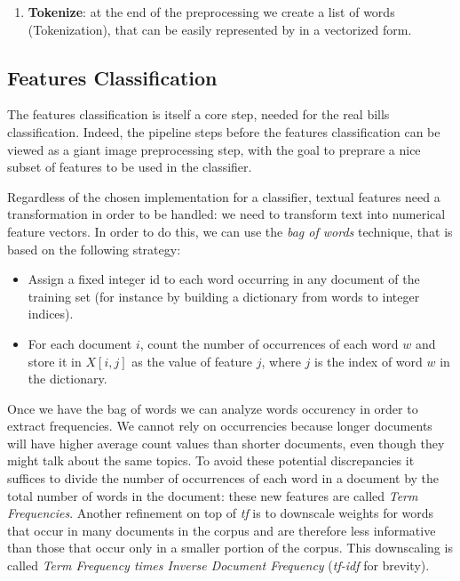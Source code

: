 \documentclass[10pt,twocolumn,letterpaper]{article}
\begin{document}
\begin{enumerate}
    the process of grouping together the inflected forms of a word so
    they can be analysed as a single item, identified by the word's
    lemma, or dictionary form.\footnote{\href{
        https://en.wikipedia.org/wiki/Lemmatisation}{
        https://en.wikipedia.org/wiki/Lemmatisation}}. With
    this step, indeed, we tried to group words together in order to
    simplify the classification phase. However, we noticed that this
    step do not improve the performance and it can also produce worst
    results as it tries to group wrong words retrieved from the OCR.
  \item \textbf{Tokenize}: at the end of the preprocessing we create a list of
    words (Tokenization), that can be easily represented by in a
    vectorized form.
\end{enumerate}

\subsection{Features Classification}
\label{subsec:classification}

The features classification is itself a core step, needed for the real
bills classification. Indeed, the pipeline steps before the features
classification can be viewed as a giant image preprocessing step, with
the goal to preprare a nice subset of features to be used in the
classifier.

Regardless of the chosen implementation for a classifier, textual
features need a transformation in order to be handled: we need to
transform text into numerical feature vectors. In order to do this, we
can use the \emph{bag of words} technique, that is based on the
following strategy:

\begin{itemize}
  \item Assign a fixed integer id to each word occurring in any
    document of the training set (for instance by building a
    dictionary from words to integer indices).
  \item For each document $i$, count the number of occurrences of each
    word $w$ and store it in $X[i, j]$ as the value of feature $j$,
    where $j$ is the index of word $w$ in the dictionary.
\end{itemize}

Once we have the bag of words we can analyze words occurency in order
to extract frequencies. We cannot rely on occurrencies because longer
documents will have higher average count values than shorter
documents, even though they might talk about the same topics. To avoid
these potential discrepancies it suffices to divide the number of
occurrences of each word in a document by the total number of words in
the document: these new features are called \emph{Term
  Frequencies}. Another refinement on top of \emph{tf} is to downscale
weights for words that occur in many documents in the corpus and are
therefore less informative than those that occur only in a smaller
portion of the corpus. This downscaling is called \emph{Term Frequency
  times Inverse Document Frequency} (\emph{tf-idf} for brevity).
\end{document}
